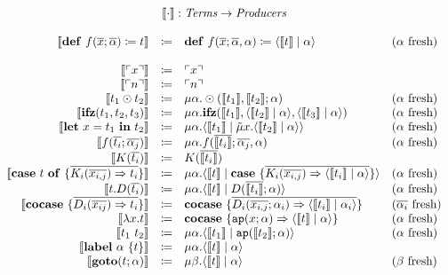 \documentclass[nonacm]{acmart}
\newcommand{\translate}[1]{\ensuremath{\llbracket #1 \rrbracket}}
\newcommand{\lit}[1]{\ensuremath{\ulcorner #1 \urcorner}}
\newcommand{\cut}[2]{\ensuremath{\langle #1 \mid #2 \rangle}}
\newcommand{\ifz}[3]{\ensuremath{\mathbf{ifz}(#1, #2, #3)}}
\newcommand{\letin}[3]{\ensuremath{\mathbf{let}\ #1 = #2\ \mathbf{in}\ #3}}
\newcommand{\caseof}[2]{\ensuremath{\mathbf{case}\ #1\ \mathbf{of}\ \{ #2 \}}}
\newcommand{\case}[1]{\ensuremath{\mathbf{case}\ \{ #1 \}}}
\newcommand{\cocase}[1]{\ensuremath{\mathbf{cocase}\ \{ #1 \}}}
\newcommand{\goto}[2]{\ensuremath{\mathbf{goto}(#1; #2)}}
\newcommand{\lab}[2]{\ensuremath{\mathbf{label}\ #1\ \{#2 \}}}
\newcommand{\defi}[2]{\ensuremath{\mathbf{def}\ #1 \coloneq #2}}
\newcommand{\fresh}[1]{\ensuremath{(#1\text{ fresh})}}
\begin{document}
\[
  \begin{array}{rcll}
    \multicolumn{4}{c}{\translate{\cdot} : \emph{Terms} \rightarrow \emph{Producers}}\\
    \\
    \translate{\defi{f(\overline{x}; \overline{\alpha})}{t}} & \coloneq & \defi{f(\overline{x}; \overline{\alpha}, \alpha)}{\cut{\translate{t}}{\alpha}} & \fresh{\alpha}\\
  \quad \\
    \translate{\lit{x}} & \coloneq & \lit{x} & \\
    \translate{\lit{n}} & \coloneq & \lit{n} & \\
    \translate{t_1 \odot t_2} & \coloneq & \mu\alpha.\odot(\translate{t_1}, \translate{t_2}; \alpha) & \fresh{\alpha}\\
    \translate{\ifz{t_1}{t_2}{t_3}} & \coloneq & \mu\alpha.\ifz{\translate{t_1}}{\cut{\translate{t_2}}{\alpha}}{\cut{\translate{t_3}}{\alpha}} & \fresh{\alpha}\\
    \translate{\letin{x}{t_1}{t_2}} & \coloneq & \mu\alpha.\cut{\translate{t_1}}{\tilde{\mu}x.\cut{\translate{t_2}}{\alpha}} & \fresh{\alpha}\\
    \translate{f(\overline{t_i}; \overline{\alpha_j})} & \coloneq & \mu\alpha.f(\overline{\translate{t_i}}; \overline{\alpha_j},\alpha) & \fresh{\alpha}\\
    \translate{K(\overline{t_i})} & \coloneq & K(\overline{\translate{t_i}}) & \\
    \translate{\caseof{t}{\overline{K_i(\overline{x_{i,j}}) \Rightarrow t_i}}} & \coloneq & \mu\alpha.\cut{\translate{t}}{\case{\overline{K_i(\overline{x_{i,j}}) \Rightarrow \cut{\translate{t_i}}{\alpha}}}} & \fresh{\alpha}\\
    \translate{t.D(\overline{t_i})} & \coloneq & \mu\alpha.\cut{\translate{t}}{D(\overline{\translate{t_i}}; \alpha)} & \fresh{\alpha}\\
    \translate{\cocase{\overline{D_i(\overline{x_{ij}})\Rightarrow t_i}}} & \coloneq & \cocase{\overline{D_i(\overline{x_{i,j}}; \alpha_i) \Rightarrow \cut{\translate{t_i}}{\alpha_i}}} & \fresh{\overline{\alpha_i}}\\
    \translate{\lambda x.t} & \coloneq & \cocase{\mathtt{ap}(x; \alpha) \Rightarrow \cut{\translate{t}}{\alpha}} & \fresh{\alpha}\\
    \translate{t_1\ t_2} & \coloneq & \mu\alpha.\cut{\translate{t_1}}{\mathtt{ap}(\translate{t_2}; \alpha)} & \fresh{\alpha}\\
    \translate{\lab{\alpha}{t}} & \coloneq & \mu\alpha.\cut{\translate{t}}{\alpha} & \\
    \translate{\goto{t}{\alpha}} & \coloneq & \mu\beta.\cut{\translate{t}}{\alpha} & \fresh{\beta}
  \end{array}
\]
\end{document}
